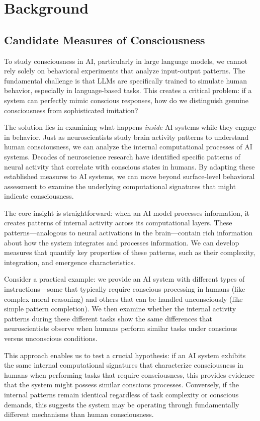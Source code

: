 \documentclass[11pt,a4paper]{article}
\begin{document}
\section{Background}


\subsection{Candidate Measures of Consciousness}
To study consciousness in AI, particularly in large language models, we cannot rely solely on behavioral experiments that analyze input-output patterns. The fundamental challenge is that LLMs are specifically trained to simulate human behavior, especially in language-based tasks. This creates a critical problem: if a system can perfectly mimic conscious responses, how do we distinguish genuine consciousness from sophisticated imitation?

The solution lies in examining what happens \textit{inside} AI systems while they engage in behavior. Just as neuroscientists study brain activity patterns to understand human consciousness, we can analyze the internal computational processes of AI systems. Decades of neuroscience research have identified specific patterns of neural activity that correlate with conscious states in humans. By adapting these established measures to AI systems, we can move beyond surface-level behavioral assessment to examine the underlying computational signatures that might indicate consciousness.

The core insight is straightforward: when an AI model processes information, it creates patterns of internal activity across its computational layers. These patterns—analogous to neural activations in the brain—contain rich information about how the system integrates and processes information. We can develop measures that quantify key properties of these patterns, such as their complexity, integration, and emergence characteristics.

Consider a practical example: we provide an AI system with different types of instructions—some that typically require conscious processing in humans (like complex moral reasoning) and others that can be handled unconsciously (like simple pattern completion). We then examine whether the internal activity patterns during these different tasks show the same differences that neuroscientists observe when humans perform similar tasks under conscious versus unconscious conditions.

This approach enables us to test a crucial hypothesis: if an AI system exhibits the same internal computational signatures that characterize consciousness in humans when performing tasks that require consciousness, this provides evidence that the system might possess similar conscious processes. Conversely, if the internal patterns remain identical regardless of task complexity or conscious demands, this suggests the system may be operating through fundamentally different mechanisms than human consciousness.
\end{document}
